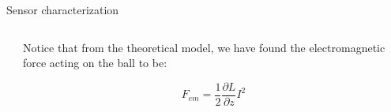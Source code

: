 \begin{frame}{Sensor characterization}
{\begin{columns}[c, onlytextwidth]
\begin{column}{0.65\textwidth}
            \end{column}

            \begin{column}{0.35\textwidth}

                Notice that from the theoretical model, we have found the electromagnetic force acting on the ball to be:

                \begin{equation}
                    F_{em} = \frac{1}{2} \frac{\partial L}{\partial z} I^2
                \end{equation}

            \end{column}

        \end{columns}

    }

\end{frame}